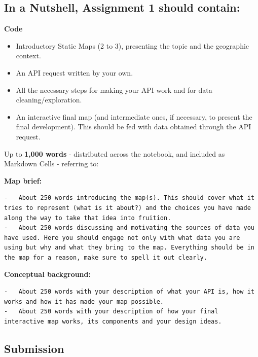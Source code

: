 \documentclass[
  letterpaper,
  DIV=11,
  numbers=noendperiod]{scrreprt}
\providecommand{\tightlist}{%
  \setlength{\itemsep}{0pt}\setlength{\parskip}{0pt}}\usepackage{longtable,booktabs,array}
\begin{document}
\hypertarget{in-a-nutshell-assignment-1-should-contain}{%
\subsection*{In a Nutshell, Assignment 1 should
contain:}\label{in-a-nutshell-assignment-1-should-contain}}

\textbf{Code}

\begin{itemize}
\tightlist
\item
  Introductory Static Maps (2 to 3), presenting the topic and the
  geographic context.
\item
  An API request written by your own.
\item
  All the necessary steps for making your API work and for data
  cleaning/exploration.
\item
  An interactive final map (and intermediate ones, if necessary, to
  present the final development). This should be fed with data obtained
  through the API request.
\end{itemize}

Up to \textbf{1,000 words} - distributed across the notebook, and
included as Markdown Cells - referring to:

\textbf{Map brief:}

\begin{verbatim}
-   About 250 words introducing the map(s). This should cover what it tries to represent (what is it about?) and the choices you have made along the way to take that idea into fruition.
-   About 250 words discussing and motivating the sources of data you have used. Here you should engage not only with what data you are using but why and what they bring to the map. Everything should be in the map for a reason, make sure to spell it out clearly.
\end{verbatim}

\textbf{Conceptual background:}

\begin{verbatim}
-   About 250 words with your description of what your API is, how it works and how it has made your map possible.
-   About 250 words with your description of how your final interactive map works, its components and your design ideas.
\end{verbatim}

\hypertarget{submission}{%
\subsection*{Submission}\label{submission}}
\end{document}
